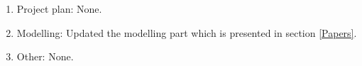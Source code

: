 \begin{enumerate}
    \item Project plan: None.
    \item Modelling: Updated the modelling part which is presented in section \ref{Papers}.
    \item Other: None.
\end{enumerate}